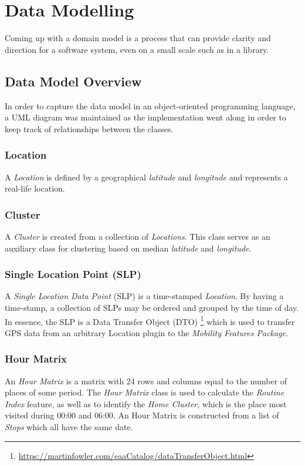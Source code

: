 \section{Data Modelling}
Coming up with a domain model is a process that can provide clarity and direction for a software system, even on a small scale such as in a library. 

\subsection{Data Model Overview}
In order to capture the data model in an object-oriented programming language, a UML diagram was maintained as the implementation went along in order to keep track of relationships between the classes. 

\subsubsection*{Location}
A \textit{Location} is defined by a geographical \textit{latitude} and \textit{longitude} and represents a real-life location.

\subsubsection*{Cluster}
A \textit{Cluster} is created from a collection of \textit{Locations}. This class serves as an auxiliary class for clustering based on median \textit{latitude} and \textit{longitude}.

\subsubsection*{Single Location Point (SLP)}
A \textit{Single Location Data Point} (SLP) is a time-stamped \textit{Location}. By having a time-stamp, a collection of SLPs may be ordered and grouped by the time of day. In essence, the SLP is a Data Transfer Object (DTO) \footnote{\url{https://martinfowler.com/eaaCatalog/dataTransferObject.html}} which is used to transfer GPS data from an arbitrary Location plugin to the \textit{Mobility Features Package}.

\subsubsection*{Hour Matrix}
An \textit{Hour Matrix} is a matrix with 24 rows and columns equal to the number of places of some period. The \textit{Hour Matrix} class is used to calculate the \textit{Routine Index} feature, as well as to identify the \textit{Home Cluster}, which is the place most visited during 00:00 and 06:00. An Hour Matrix is constructed from a list of \textit{Stops} which all have the same date.

